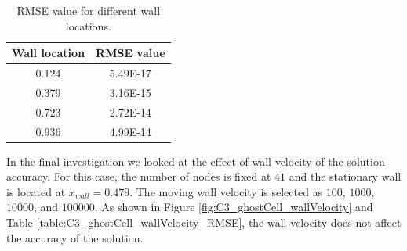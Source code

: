 \begin{table}[H]
\centering
\begin{tabular}{c | c}
     Wall location & RMSE value \\ \hline \hline
     0.124 & 5.49E-17 \\ \hline
     0.379 & 3.16E-15 \\ \hline
     0.723 & 2.72E-14 \\ \hline
     0.936 & 4.99E-14
\end{tabular}
\caption{RMSE value for different wall locations.}
\label{table:C3_ghostCell_wallLocation_RMSE}
\end{table}

In the final investigation we looked at the effect of wall velocity of the solution accuracy. For this case, the number of nodes is fixed at $41$ and the stationary wall is located at $x_{wall} = 0.479$. The moving wall velocity is selected as $100$, $1000$, $10000$, and $100000$. As shown in Figure \ref{fig:C3_ghostCell_wallVelocity} and Table \ref{table:C3_ghostCell_wallVelocity_RMSE}, the wall velocity does not affect the accuracy of the solution.

